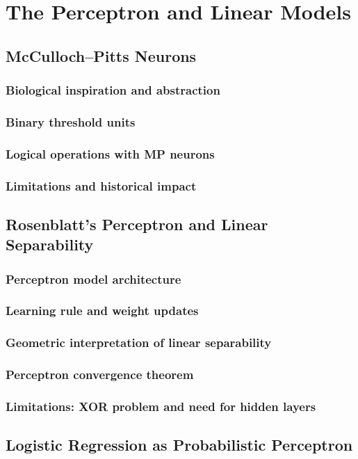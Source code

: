 ﻿\chapter{The Perceptron and Linear Models}
\section{McCulloch--Pitts Neurons}
\subsection{Biological inspiration and abstraction}
\subsection{Binary threshold units}
\subsection{Logical operations with MP neurons}
\subsection{Limitations and historical impact}

\section{Rosenblatt’s Perceptron and Linear Separability}
\subsection{Perceptron model architecture}
\subsection{Learning rule and weight updates}
\subsection{Geometric interpretation of linear separability}
\subsection{Perceptron convergence theorem}
\subsection{Limitations: XOR problem and need for hidden layers}

\section{Logistic Regression as Probabilistic Perceptron}
